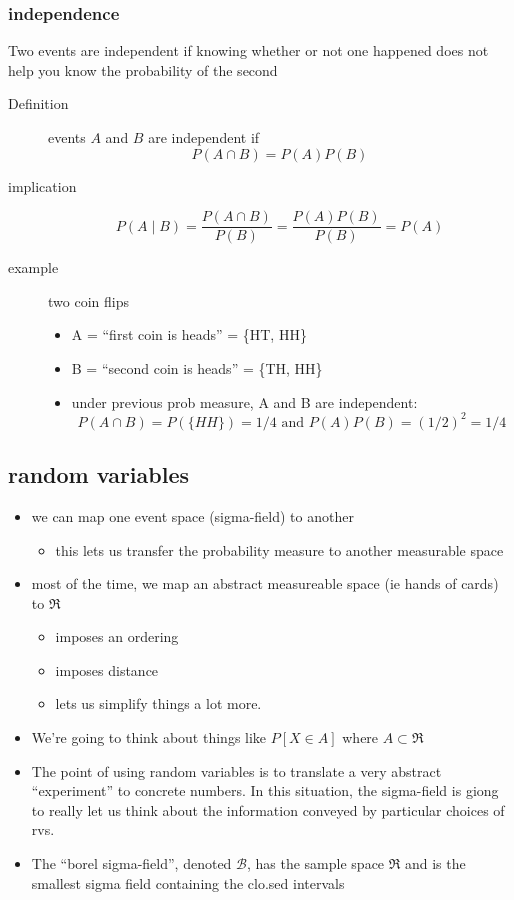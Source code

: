 \documentclass[11pt]{article}
\begin{document}
\subsubsection{independence}
\label{sec-1-2-3}

      Two events are independent if knowing whether or not one
      happened does not help you know the probability of the second
\begin{description}
\item[Definition] events $A$ and $B$ are independent if \[P(A \cap
                      B) = P(A) P(B)\]
\item[implication] \[P(A \mid B) = \frac{P(A \cap B)}{P(B)} =
                       \frac{P(A) P(B)}{P(B)} = P(A)\]
\item[example] two coin flips
\begin{itemize}
\item A = ``first coin is heads'' = \{HT, HH\}
\item B = ``second coin is heads'' = \{TH, HH\}
\item under previous prob measure, A and B are independent: \[P(A
          \cap B) = P(\{HH\}) = 1/4 \text{ and } P(A)P(B) = (1/2)^2 = 1/4\]
\end{itemize}
\end{description}
\subsection{random variables}
\label{sec-1-3}

\begin{itemize}
\item we can map one event space (sigma-field) to another
\begin{itemize}
\item this lets us transfer the probability measure to another
        measurable space
\end{itemize}
\item most of the time, we map an abstract measureable space (ie hands
      of cards) to $\Re$
\begin{itemize}
\item imposes an ordering
\item imposes distance
\item lets us simplify things a lot more.
\end{itemize}
\item We're going to think about things like $P[X \in A]$ where $A
      \subset \Re$
\item The point of using random variables is to translate a very
      abstract ``experiment'' to concrete numbers.  In this situation,
      the sigma-field is giong to really let us think about the
      information conveyed by particular choices of rvs.
\item The ``borel sigma-field'', denoted $\mathcal B$, has the sample
      space $\Re$ and is the smallest sigma field containing the
      clo.sed intervals
\end{itemize}
\end{document}
